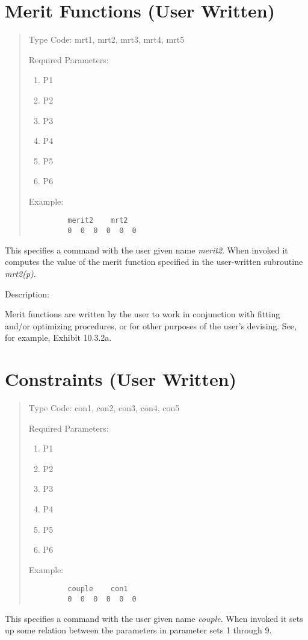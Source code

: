 \newpage
\section{Merit Functions (User Written)} 
\begin{quotation}
\noindent Type Code:  mrt1, mrt2, mrt3, mrt4, mrt5
\vspace{5mm}

\noindent Required Parameters:
\begin{enumerate}
       \item  P1
       \item  P2
       \item  P3
       \item  P4
       \item  P5
       \item  P6
\end{enumerate}

\vspace{5mm}
\noindent     Example:
\begin{verbatim}
         merit2    mrt2
         0  0  0  0  0  0
\end{verbatim}
\end{quotation}
This specifies a command with the user given name {\em merit2}.  When invoked it computes the value of the merit function specified in the user-written subroutine {\em mrt2(p)}.

\vspace{5mm}
     Description:
\vspace{2mm}

Merit functions are written by the user to work in conjunction with fitting and/or optimizing procedures, or for other purposes of the user's devising.  See, for example, Exhibit 10.3.2a.

\newpage
\section{Constraints (User Written)} 
\begin{quotation}
\noindent Type Code:  con1, con2, con3, con4, con5
\vspace{5mm}

\noindent Required Parameters:
\begin{enumerate}
       \item  P1
       \item  P2
       \item  P3
       \item  P4
       \item  P5
       \item  P6
\end{enumerate}

\vspace{5mm}
\noindent Example:
\begin{verbatim}
         couple    con1
         0  0  0  0  0  0
\end{verbatim}
\end{quotation}
This specifies a command with the user given name {\em couple}.  When invoked it sets up some relation between the parameters in parameter sets 1 through 9.

